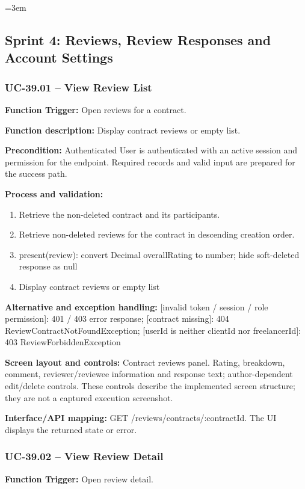 \begingroup\sloppy\emergencystretch=3em\relax
\subsection{Sprint 4: Reviews, Review Responses and Account Settings}

\subsubsection{UC-39.01 -- View Review List}
\textbf{Function Trigger:} Open reviews for a contract.

\textbf{Function description:} Display contract reviews or empty list.

\textbf{Precondition:} Authenticated User is authenticated with an active session and permission for the endpoint. Required records and valid input are prepared for the success path.

\textbf{Process and validation:}
\begin{enumerate}
\item Retrieve the non-deleted contract and its participants.
\item Retrieve non-deleted reviews for the contract in descending creation order.
\item present(review): convert Decimal overall\allowbreak{}Rating to number; hide soft-deleted response as null
\item Display contract reviews or empty list
\end{enumerate}
\textbf{Alternative and exception handling:} [invalid token /\allowbreak{} session /\allowbreak{} role permission]: 401 /\allowbreak{} 403 error response; [contract missing]: 404 Review\allowbreak{}Contract\allowbreak{}Not\allowbreak{}Found\allowbreak{}Exception; [user\allowbreak{}Id is neither client\allowbreak{}Id nor freelancer\allowbreak{}Id]: 403 Review\allowbreak{}Forbidden\allowbreak{}Exception

\textbf{Screen layout and controls:} Contract reviews panel. Rating, breakdown, comment, reviewer/\allowbreak{}reviewee information and response text; author-dependent edit/\allowbreak{}delete controls. These controls describe the implemented screen structure; they are not a captured execution screenshot.

\textbf{Interface/\allowbreak{}API mapping:} GET /\allowbreak{}reviews/\allowbreak{}contracts/\allowbreak{}:contract\allowbreak{}Id. The UI displays the returned state or error.

\subsubsection{UC-39.02 -- View Review Detail}
\textbf{Function Trigger:} Open review detail.

